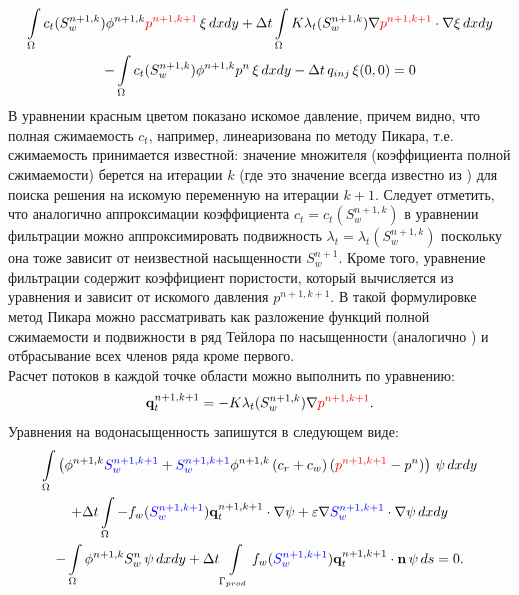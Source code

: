 \begin{multline}\label{eq:FiltrationLinear}
	 \int\limits_\Omega c_t (S_w^{n+1, k})\phi^{n+1, k} {\color{red}p^{n+1, k+1}}\, \xi \,dx dy 
	 + \Delta t \int\limits_\Omega K \lambda_t (S_w^{n+1, k}) \nabla {\color{red}p^{n+1, k+1} }\cdot \nabla\xi \,dx dy \\ 
	 -\int\limits_\Omega c_t (S_w^{n+1, k})\phi^{n+1, k} p^{n}\, \xi \,dx dy-\Delta t\, q_{inj} \, \xi(0,0) =0
\end{multline}
В уравнении  красным цветом показано искомое давление, причем видно, что полная сжимаемость
 $c_t$, например, линеаризована по методу Пикара, т.е. сжимаемость принимается известной: значение множителя 
 (коэффициента полной сжимаемости) берется на итерации $k$ (где это значение всегда известно из ) 
 для поиска решения на искомую переменную на итерации $k+1$. Следует отметить, что аналогично аппроксимации 
 коэффициента $c_t = c_t (S_w^{n+1, k})$ в уравнении фильтрации можно аппроксимировать подвижность 
$\lambda_t = \lambda_t (S_w^{n+1, k})$ поскольку она тоже зависит от неизвестной насыщенности $S_w^{n+1}$.
Кроме того, уравнение фильтрации содержит коэффициент пористости, который вычисляется из уравнения
 и зависит от искомого давления $p^{n+1, k+1}$. В такой формулировке метод Пикара
можно рассматривать как разложение функций полной сжимаемости и подвижности в ряд Тейлора по насыщенности 
(аналогично ) и отбрасывание всех членов ряда кроме первого.\\
Расчет потоков в каждой точке области можно выполнить по уравнению:
\begin{equation}
	\mathbf{q}_t^{n+1, k+1} = -K\lambda_t (S_w^{n+1,k})\nabla {\color{red}p^{n+1, k+1} }.
\end{equation}
Уравнения на водонасыщенность запишутся в следующем виде:
\begin{multline}\label{eq:saturation_num}
	\int\limits_\Omega \left(\phi^{n+1,k} {\color{blue}S_w^{n+1,k+1}} 
	+ {\color{blue}S_w^{n+1,k+1}}\phi^{n+1,k}\left(c_r + c_w \right)({\color{red}p^{n+1,k+1}} - p^n)  \right)\,\psi \,dx dy \\
	+ \Delta t\int\limits_\Omega -f_w ({\color{blue}S_w^{n+1,k+1}}) \mathbf{q}_t^{n+1, k+1} \cdot \nabla \psi +  \varepsilon \nabla {\color{blue}S_w^{n+1,k+1}} \cdot \nabla \psi \,dx dy \\
	-\int\limits_\Omega \phi^{n+1,k} S_w^{n} \,\psi \,dx dy
	+\Delta t\int\limits_{\Gamma_{prod}} f_w({\color{blue}S_w^{n+1,k+1}}) \mathbf{q}_t^{n+1, k+1} \cdot \mathbf{n} \,\psi \, ds = 0.
\end{multline}
